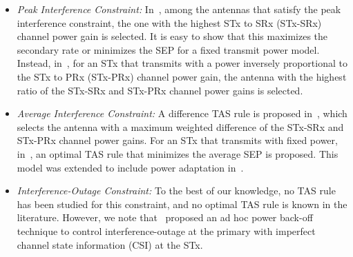 \documentclass[12pt,draftcls,peerreview,onecolumn]{IEEEtran}
\begin{document}
\begin{itemize}
\item {\em Peak Interference Constraint:} In~\cite{Hanif_2015_globecom}, among the antennas that satisfy the peak interference constraint, the one with the highest STx to SRx (STx-SRx) channel power gain is selected. It is easy to show that this maximizes the secondary rate or minimizes the SEP for a fixed transmit power model. Instead, in~\cite{Wang_2010_TWC}, for an  STx that transmits with a power inversely proportional to the STx to PRx (STx-PRx) channel power gain, the antenna with the highest ratio of the STx-SRx and STx-PRx channel power gains is selected. 
%
\item {\em Average Interference Constraint:} A difference TAS rule is proposed in~\cite{Wang_2011_TCom}, which selects the antenna with a maximum weighted difference of the STx-SRx and STx-PRx channel power gains. For an STx that transmits with fixed power, in~\cite{Sarvendranath_2013_TCOM}, an optimal TAS rule that minimizes the average SEP is proposed. %
This model was extended to include power adaptation in~\cite{Sarvendranath_2014_TCOM}. %
%
\item{\em Interference-Outage Constraint:} To the best of our knowledge, no TAS rule has been studied for this constraint, and no optimal TAS rule is known in the literature. However, we note that~\cite{Peng_2016_eurasip} proposed an ad hoc power back-off technique to control interference-outage at the primary with imperfect channel state information (CSI) at the STx.

\end{itemize}
\end{document}

